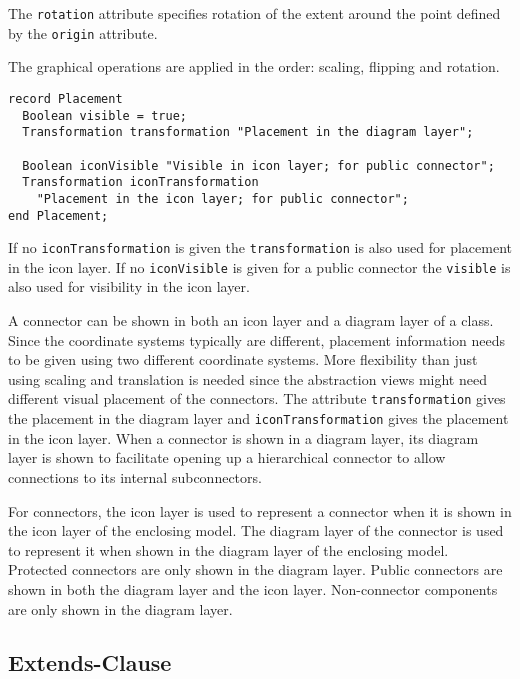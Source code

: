 The \lstinline!rotation! attribute specifies rotation of the extent around the point defined by the \lstinline!origin! attribute.

The graphical operations are applied in the order: scaling, flipping and rotation.

\begin{lstlisting}[language=modelica]
record Placement
  Boolean visible = true;
  Transformation transformation "Placement in the diagram layer";

  Boolean iconVisible "Visible in icon layer; for public connector";
  Transformation iconTransformation
    "Placement in the icon layer; for public connector";
end Placement;
\end{lstlisting}%
If no \lstinline!iconTransformation! is given the \lstinline!transformation! is also used for placement in the icon layer.
If no \lstinline!iconVisible! is given for a public connector the \lstinline!visible! is also used for visibility in the icon layer.

\begin{nonnormative}
A connector can be shown in both an icon layer and a diagram
layer of a class. Since the coordinate systems typically are different,
placement information needs to be given using two different coordinate
systems. More flexibility than just using scaling and translation is
needed since the abstraction views might need different visual placement
of the connectors. The attribute \lstinline!transformation! gives the placement in
the diagram layer and \lstinline!iconTransformation! gives the placement in the icon
layer. When a connector is shown in a diagram layer, its diagram layer
is shown to facilitate opening up a hierarchical connector to allow
connections to its internal subconnectors.
\end{nonnormative}

For connectors, the icon layer is used to represent a connector when it
is shown in the icon layer of the enclosing model. The diagram layer of
the connector is used to represent it when shown in the diagram layer of
the enclosing model. Protected connectors are only shown in the diagram
layer. Public connectors are shown in both the diagram layer and the
icon layer. Non-connector components are only shown in the diagram
layer.

\subsection{Extends-Clause}\label{extends-clause}


